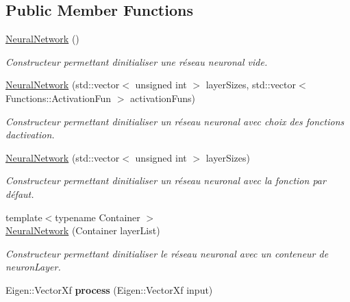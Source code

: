 \subsection*{Public Member Functions}
\begin{DoxyCompactItemize}
\item 
\mbox{\label{classNeuralNetwork_accce4a7728e89a009a9d4ca1758c9b9d}} 
\hyperlink{classNeuralNetwork_accce4a7728e89a009a9d4ca1758c9b9d}{Neural\+Network} ()
\begin{DoxyCompactList}\small\item\em Constructeur permettant d\textquotesingle{}initialiser une réseau neuronal vide. \end{DoxyCompactList}\item 
\hyperlink{classNeuralNetwork_a85cd20f411e96dfd28954fcda39badb7}{Neural\+Network} (std\+::vector$<$ unsigned int $>$ layer\+Sizes, std\+::vector$<$ Functions\+::\+Activation\+Fun $>$ activation\+Funs)
\begin{DoxyCompactList}\small\item\em Constructeur permettant d\textquotesingle{}initialiser un réseau neuronal avec choix des fonctions d\textquotesingle{}activation. \end{DoxyCompactList}\item 
\hyperlink{classNeuralNetwork_ab4015471a72a3d00b6bcabf156526f7b}{Neural\+Network} (std\+::vector$<$ unsigned int $>$ layer\+Sizes)
\begin{DoxyCompactList}\small\item\em Constructeur permettant d\textquotesingle{}initialiser un réseau neuronal avec la fonction par défaut. \end{DoxyCompactList}\item 
{\footnotesize template$<$typename Container $>$ }\\\hyperlink{classNeuralNetwork_a7943bb4e9cb96aae048b236d4f1dd979}{Neural\+Network} (Container layer\+List)
\begin{DoxyCompactList}\small\item\em Constructeur permettant d\textquotesingle{}initialiser le réseau neuronal avec un conteneur de neuron\+Layer. \end{DoxyCompactList}\item 
\mbox{\label{classNeuralNetwork_a98cab3b3726fbf06dca316068c29c783}} 
Eigen\+::\+Vector\+Xf {\bfseries process} (Eigen\+::\+Vector\+Xf input)
\end{DoxyCompactItemize}
